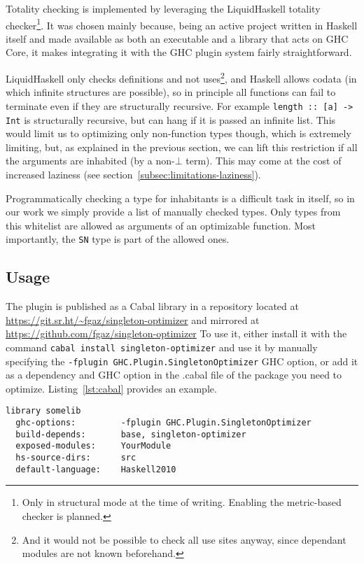 Totality checking is implemented by leveraging the LiquidHaskell\cite{refinement-types-for-haskell}\cite{liquidhaskell-website} totality checker\footnote{Only in structural mode at the time of writing. Enabling the metric-based checker is planned.}.
It was chosen mainly because, being an active project written in Haskell itself and made available as both an executable and a library that acts on GHC Core, it makes integrating it with the GHC plugin system fairly straightforward.

LiquidHaskell only checks definitions and not uses\footnote{And it would not be possible to check all use sites anyway, since dependant modules are not known beforehand.}, and Haskell allows codata (in which infinite structures are possible), so in principle all functions can fail to terminate even if they are structurally recursive. For example \texttt{length :: [a] -> Int} is structurally recursive, but can hang if it is passed an infinite list.
This would limit us to optimizing only non-function types though, which is extremely limiting, but, as explained in the previous section, we can lift this restriction if all the arguments are inhabited (by a non-$\bot$ term).
This may come at the cost of increased laziness (see section~\ref{subsec:limitations-laziness}).

Programmatically checking a type for inhabitants is a difficult task in itself, so in our work we simply provide a list of manually checked types.
Only types from this whitelist are allowed as arguments of an optimizable function.
Most importantly, the \texttt{SN} type is part of the allowed ones.

\subsection{Usage}
\label{subsec:usage}

The plugin is published as a Cabal library in a repository located at \url{https://git.sr.ht/~fgaz/singleton-optimizer} and mirrored at \url{https://github.com/fgaz/singleton-optimizer}
To use it, either install it with the command \texttt{cabal install singleton-optimizer} and use it by manually specifying the \texttt{-fplugin GHC.Plugin.SingletonOptimizer} GHC option, or add it as a dependency and GHC option in the .cabal file of the package you need to optimize.
Listing~\ref{lst:cabal} provides an example.

\begin{lstlisting}[label=lst:cabal, caption=Example .cabal stanza]
library somelib
  ghc-options:         -fplugin GHC.Plugin.SingletonOptimizer
  build-depends:       base, singleton-optimizer
  exposed-modules:     YourModule
  hs-source-dirs:      src
  default-language:    Haskell2010
\end{lstlisting}

